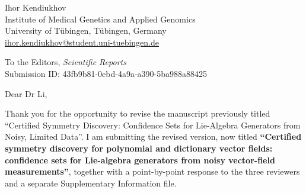 \documentclass[11pt,a4paper]{article}
\begin{document}
\begin{flushright}
Ihor Kendiukhov\\
Institute of Medical Genetics and Applied Genomics\\
University of T\"ubingen, T\"ubingen, Germany\\
\href{mailto:ihor.kendiukhov@student.uni-tuebingen.de}{ihor.kendiukhov@student.uni-tuebingen.de}
\end{flushright}

\vspace{1em}

To the Editors, \emph{Scientific Reports}\\
Submission ID: 43fb9b81-0ebd-4a9a-a390-5ba988a88425

\vspace{0.5em}

Dear Dr Li,

Thank you for the opportunity to revise the manuscript previously titled
``Certified Symmetry Discovery: Confidence Sets for Lie-Algebra Generators from
Noisy, Limited Data''. I am submitting the revised version, now titled
\textbf{``Certified symmetry discovery for polynomial and dictionary vector
fields: confidence sets for Lie-algebra generators from noisy vector-field
measurements''}, together
with a point-by-point response to the three reviewers and a separate
Supplementary Information file.
\end{document}
